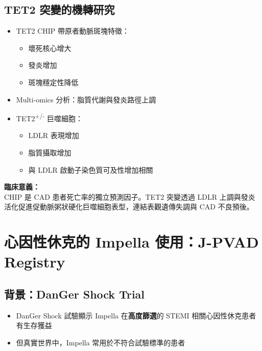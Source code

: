 \documentclass[12pt,a4paper]{article}
\begin{document}
\subsection{TET2 突變的機轉研究}

\begin{itemize}
    \item TET2 CHIP 帶原者動脈斑塊特徵：
    \begin{itemize}
        \item 壞死核心增大
        \item 發炎增加
        \item 斑塊穩定性降低
    \end{itemize}
    \item Multi-omics 分析：脂質代謝與發炎路徑上調
    \item TET2\textsuperscript{+/-} 巨噬細胞：
    \begin{itemize}
        \item LDLR 表現增加
        \item 脂質攝取增加
        \item 與 LDLR 啟動子染色質可及性增加相關
    \end{itemize}
\end{itemize}

\begin{importantbox}
\textbf{臨床意義：}\\
CHIP 是 CAD 患者死亡率的獨立預測因子。TET2 突變透過 LDLR 上調與發炎活化促進促動脈粥狀硬化巨噬細胞表型，連結表觀遺傳失調與 CAD 不良預後。
\end{importantbox}

\section{心因性休克的 Impella 使用：J-PVAD Registry}

\subsection{背景：DanGer Shock Trial}

\begin{itemize}
    \item DanGer Shock 試驗顯示 Impella 在\textbf{高度篩選}的 STEMI 相關心因性休克患者有生存獲益
    \item 但真實世界中，Impella 常用於不符合試驗標準的患者
\end{itemize}
\end{document}
